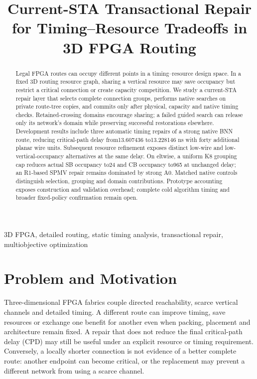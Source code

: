 \documentclass[conference,10pt]{IEEEtran}
\title{Current-STA Transactional Repair for Timing--Resource Tradeoffs in 3D FPGA Routing}
\author{\IEEEauthorblockN{Anonymous development manuscript}}
\begin{document}
\maketitle
\begin{abstract}
Legal FPGA routes can occupy different points in a timing--resource design space. In a fixed 3D routing resource graph, sharing a vertical resource may save occupancy but restrict a critical connection or create capacity competition. We study a current-STA repair layer that selects complete connection groups, performs native searches on private route-tree copies, and commits only after physical, capacity and native timing checks. Retained-crossing domains encourage sharing; a failed guided search can release only its network's domain while preserving successful restorations elsewhere. Development results include three automatic timing repairs of a strong native BNN route, reducing critical-path delay from13.607436 to13.228146 ns with forty additional planar wire units. Subsequent resource refinement exposes distinct low-wire and low-vertical-occupancy alternatives at the same delay. On eltwise, a uniform K8 grouping cap reduces actual SB occupancy to24 and CB occupancy to965 at unchanged delay; an R1-based SPMV repair remains dominated by strong A0. Matched native controls distinguish selection, grouping and domain contributions. Prototype accounting exposes construction and validation overhead; complete cold algorithm timing and broader fixed-policy confirmation remain open.
\end{abstract}
\begin{IEEEkeywords}
3D FPGA, detailed routing, static timing analysis, transactional repair, multiobjective optimization
\end{IEEEkeywords}

\section{Problem and Motivation}
Three-dimensional FPGA fabrics couple directed reachability, scarce vertical channels and detailed timing. A different route can improve timing, save resources or exchange one benefit for another even when packing, placement and architecture remain fixed. A repair that does not reduce the final critical-path delay (CPD) may still be useful under an explicit resource or timing requirement. Conversely, a locally shorter connection is not evidence of a better complete route: another endpoint can become critical, or the replacement may prevent a different network from using a scarce channel.
\end{document}
